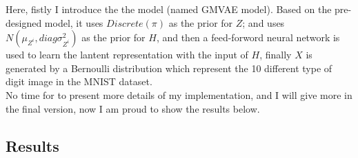 \documentclass[a4paper]{article}
\begin{document}
Here, fistly I introduce the the model (named GMVAE model). Based on the 
pre-designed model,  it uses $Discrete(\pi)$ as the prior for $Z$; and uses 
$N(\mu_{Z^{i}}, diag{\sigma_{Z^{i}}^{2}})$ as the prior for $H$, and then a feed-forword
neural network is used to learn the lantent representation with the input of $H$, finally 
$X$ is generated by a Bernoulli distribution which represent the 10 different type of digit 
image in the MNIST dataset.
\\
No time for to present more details of my implementation, and I will give more in the final version, now I am proud to show the results below.

\subsection{Results}
\begin{landscape}
\begin{figure}
\centering
{}

\end{figure}
\end{landscape}
\end{document}
